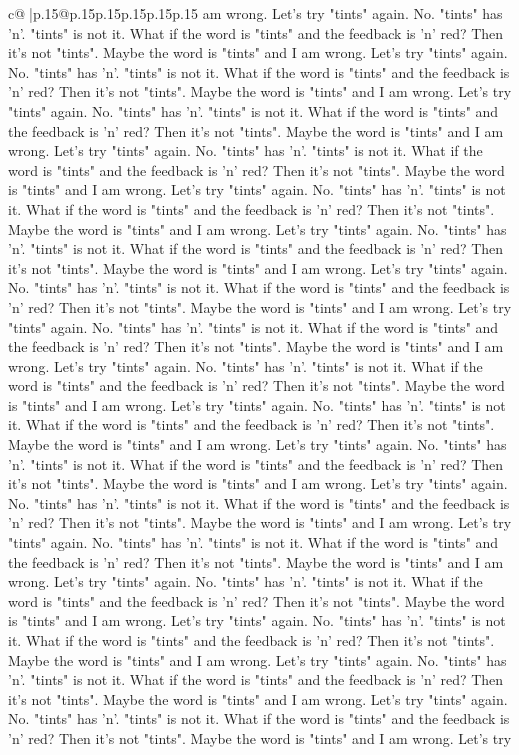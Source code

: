 \documentclass{article}
\begin{document}
{\begin{supertabular}{c@{$\;$}|p{.15\linewidth}@{}p{.15\linewidth}p{.15\linewidth}p{.15\linewidth}p{.15\linewidth}p{.15\linewidth}}
{{{am wrong. Let's try "tints" again. No. "tints" has 'n'. "tints" is not it. What if the word is "tints" and the feedback is 'n' red? Then it's not "tints". Maybe the word is "tints" and I am wrong. Let's try "tints" again. No. "tints" has 'n'. "tints" is not it. What if the word is "tints" and the feedback is 'n' red? Then it's not "tints". Maybe the word is "tints" and I am wrong. Let's try "tints" again. No. "tints" has 'n'. "tints" is not it. What if the word is "tints" and the feedback is 'n' red? Then it's not "tints". Maybe the word is "tints" and I am wrong. Let's try "tints" again. No. "tints" has 'n'. "tints" is not it. What if the word is "tints" and the feedback is 'n' red? Then it's not "tints". Maybe the word is "tints" and I am wrong. Let's try "tints" again. No. "tints" has 'n'. "tints" is not it. What if the word is "tints" and the feedback is 'n' red? Then it's not "tints". Maybe the word is "tints" and I am wrong. Let's try "tints" again. No. "tints" has 'n'. "tints" is not it. What if the word is "tints" and the feedback is 'n' red? Then it's not "tints". Maybe the word is "tints" and I am wrong. Let's try "tints" again. No. "tints" has 'n'. "tints" is not it. What if the word is "tints" and the feedback is 'n' red? Then it's not "tints". Maybe the word is "tints" and I am wrong. Let's try "tints" again. No. "tints" has 'n'. "tints" is not it. What if the word is "tints" and the feedback is 'n' red? Then it's not "tints". Maybe the word is "tints" and I am wrong. Let's try "tints" again. No. "tints" has 'n'. "tints" is not it. What if the word is "tints" and the feedback is 'n' red? Then it's not "tints". Maybe the word is "tints" and I am wrong. Let's try "tints" again. No. "tints" has 'n'. "tints" is not it. What if the word is "tints" and the feedback is 'n' red? Then it's not "tints". Maybe the word is "tints" and I am wrong. Let's try "tints" again. No. "tints" has 'n'. "tints" is not it. What if the word is "tints" and the feedback is 'n' red? Then it's not "tints". Maybe the word is "tints" and I am wrong. Let's try "tints" again. No. "tints" has 'n'. "tints" is not it. What if the word is "tints" and the feedback is 'n' red? Then it's not "tints". Maybe the word is "tints" and I am wrong. Let's try "tints" again. No. "tints" has 'n'. "tints" is not it. What if the word is "tints" and the feedback is 'n' red? Then it's not "tints". Maybe the word is "tints" and I am wrong. Let's try "tints" again. No. "tints" has 'n'. "tints" is not it. What if the word is "tints" and the feedback is 'n' red? Then it's not "tints". Maybe the word is "tints" and I am wrong. Let's try "tints" again. No. "tints" has 'n'. "tints" is not it. What if the word is "tints" and the feedback is 'n' red? Then it's not "tints". Maybe the word is "tints" and I am wrong. Let's try "tints" again. No. "tints" has 'n'. "tints" is not it. What if the word is "tints" and the feedback is 'n' red? Then it's not "tints". Maybe the word is "tints" and I am wrong. Let's try "tints" again. No. "tints" has 'n'. "tints" is not it. What if the word is "tints" and the feedback is 'n' red? Then it's not "tints". Maybe the word is "tints" and I am wrong. Let's try }}}
\end{supertabular}}
\end{document}
